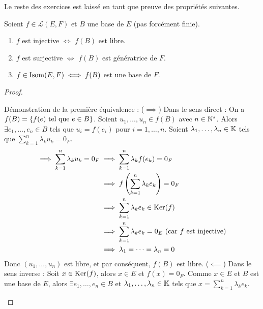 \documentclass[12pt, a4paper]{report}
\begin{document}
Le reste des exercices est laissé en tant que preuve des propriétés suivantes.

\begin{property}
    Soient $f \in \mathcal L(E,F)$ et $B$ une base de $E$ (pas forcément finie).

    \begin{enumerate}
        \item $f$ est injective $\iff$ $f(B)$ est libre.
        \item $f$ est surjective $\iff$ $f(B)$ est génératrice de $F$.
        \item $f \in \mathrm{Isom}(E,F) \iff f(B)$ est une base de $F$.
    \end{enumerate}
\end{property}

\begin{proof}
    \begin{outline}
        \1 Démonstration de la première équivalence :
        \2 ($\implies$) Dans le sens direct :
        \3 On a $f(B) = \{f(e) \text{ tel que } e \in B\}$.
        \3 Soient $u_1,\dots,u_n \in f(B)$ avec $n \in \mathbb{N}^*$. Alors $\exists e_1,\dots,e_n \in B$ tels que $u_i = f(e_i)$ pour $i=1,\dots,n$.
        \3 Soient $\lambda_1,\dots,\lambda_n \in \mathbb{K}$ tels que $\sum_{k=1}^{n}\lambda_k u_k = 0_F$.
        \begin{align*}
            \implies \sum_{k=1}^{n}\lambda_k u_k = 0_F &\implies \sum_{k=1}^{n}\lambda_k f(e_k) = 0_F\\
            &\implies f\left(\sum_{k=1}^{n}\lambda_k e_k\right) = 0_F\\
            &\implies \sum_{k=1}^{n}\lambda_k e_k \in \mathrm{Ker}(f)\\
            &\implies \sum_{k=1}^{n}\lambda_k e_k = 0_E \text{ (car $f$ est injective)}\\
            &\implies \lambda_1 = \dots = \lambda_n = 0
        \end{align*}
        \3 Donc $(u_1,\dots,u_n)$ est libre, et par conséquent, $f(B)$ est libre.
        \2 ($\impliedby$) Dans le sens inverse :
        \3 Soit $x \in \mathrm{Ker}(f)$, alors $x\in E$ et $f(x) = 0_F$.
        \3 Comme $x \in E$ et $B$ est une base de $E$, alors $\exists e_1,\dots,e_n \in B$ et $\lambda_1,\dots,\lambda_n \in \mathbb{K}$ tels que $x = \sum_{k=1}^{n}\lambda_k e_k$.
    \end{outline}
\end{proof}
\end{document}
